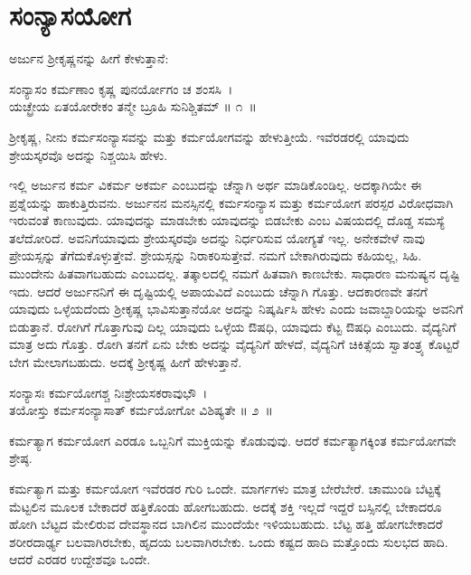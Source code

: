 
\chapter{ಸಂನ್ಯಾಸಯೋಗ}

ಅರ್ಜುನ ಶ‍್ರೀಕೃಷ್ಣನನ್ನು ಹೀಗೆ ಕೇಳುತ್ತಾನೆ:

\begin{shloka}
ಸಂನ್ಯಾಸಂ ಕರ್ಮಣಾಂ ಕೃಷ್ಣ ಪುನರ್ಯೋಗಂ ಚ ಶಂಸಸಿ~।\\ಯಚ್ಛ್ರೇಯ ಏತಯೋರೇಕಂ ತನ್ಮೇ ಬ್ರೂಹಿ ಸುನಿಶ್ಚಿತಮ್ \hfill॥ ೧~॥
\end{shloka}

\begin{artha}
ಶ‍್ರೀಕೃಷ್ಣ, ನೀನು ಕರ್ಮಸಂನ್ಯಾಸವನ್ನು ಮತ್ತು ಕರ್ಮಯೋಗವನ್ನು ಹೇಳುತ್ತೀಯೆ. ಇವೆರಡರಲ್ಲಿ ಯಾವುದು ಶ್ರೇಯಸ್ಕರವೊ ಅದನ್ನು ನಿಶ್ಚಯಿಸಿ ಹೇಳು.
\end{artha}

ಇಲ್ಲಿ ಅರ್ಜುನ ಕರ್ಮ ವಿಕರ್ಮ ಅಕರ್ಮ ಎಂಬುದನ್ನು ಚೆನ್ನಾಗಿ ಅರ್ಥ ಮಾಡಿಕೊಂಡಿಲ್ಲ. ಅದಕ್ಕಾಗಿಯೇ ಈ ಪ್ರಶ್ನೆಯನ್ನು ಹಾಕುತ್ತಿರುವನು. ಅರ್ಜುನನ ಮನಸ್ಸಿನಲ್ಲಿ ಕರ್ಮಸಂನ್ಯಾಸ ಮತ್ತು ಕರ್ಮಯೋಗ ಪರಸ್ಪರ ವಿರೋಧವಾಗಿ ಇರುವಂತೆ ಕಾಣುವುದು. ಯಾವುದನ್ನು ಮಾಡಬೇಕು ಯಾವುದನ್ನು ಬಿಡಬೇಕು ಎಂಬ ವಿಷಯದಲ್ಲಿ ದೊಡ್ಡ ಸಮಸ್ಯೆ ತಲೆದೋರಿದೆ. ಅವನಿಗೆ\break ಯಾವುದು ಶ್ರೇಯಸ್ಕರವೊ ಅದನ್ನು ನಿರ್ಧರಿಸುವ ಯೋಗ್ಯತೆ ಇಲ್ಲ. ಅನೇಕವೇಳೆ ನಾವು ಪ್ರೇಯಸ್ಸನ್ನು ತೆಗೆದುಕೊಳ್ಳುತ್ತೇವೆ. ಶ್ರೇಯಸ್ಸನ್ನು ನಿರಾಕರಿಸುತ್ತೇವೆ. ನಮಗೆ ಬೇಕಾಗಿರುವುದು ಕಹಿಯಲ್ಲ, ಸಿಹಿ. ಮುಂದೇನು ಹಿತವಾಗಬಹುದು ಎಂಬುದಲ್ಲ. ತತ್ಕಾಲದಲ್ಲಿ ನಮಗೆ ಹಿತವಾಗಿ ಕಾಣಬೇಕು. ಸಾಧಾರಣ ಮನುಷ್ಯನ ದೃಷ್ಟಿ ಇದು. ಆದರೆ ಅರ್ಜುನನಿಗೆ ಈ ದೃಷ್ಟಿಯಲ್ಲಿ ಅಪಾಯವಿದೆ ಎಂಬುದು ಚೆನ್ನಾಗಿ ಗೊತ್ತು. ಆದಕಾರಣವೇ ತನಗೆ ಯಾವುದು ಒಳ್ಳೆಯದೆಂದು ಶ‍್ರೀಕೃಷ್ಣ ಭಾವಿಸುತ್ತಾನೆಯೋ ಅದನ್ನು ನಿಷ್ಕರ್ಷಿಸಿ ಹೇಳು ಎಂದು ಜವಾಬ್ದಾರಿಯನ್ನು ಅವನಿಗೆ ಬಿಡುತ್ತಾನೆ. ರೋಗಿಗೆ ಗೊತ್ತಾಗುವು ದಿಲ್ಲ ಯಾವುದು ಒಳ್ಳೆಯ ಔಷಧಿ, ಯಾವುದು ಕೆಟ್ಟ ಔಷಧಿ ಎಂಬುದು. ವೈದ್ಯನಿಗೆ ಮಾತ್ರ ಅದು ಗೊತ್ತು. ರೋಗಿ ತನಗೆ ಏನು ಬೇಕು ಅದನ್ನು ವೈದ್ಯನಿಗೆ ಹೇಳದೆ, ವೈದ್ಯನಿಗೆ ಚಿಕಿತ್ಸೆಯ ಸ್ವಾತಂತ್ರ್ಯ ಕೊಟ್ಟರೆ ಬೇಗ ಮೇಲಾಗಬಹುದು. ಅದಕ್ಕೆ ಶ‍್ರೀಕೃಷ್ಣ ಹೀಗೆ ಹೇಳುತ್ತಾನೆ.

\begin{shloka}
ಸಂನ್ಯಾಸಃ ಕರ್ಮಯೋಗಶ್ಚ ನಿಃಶ್ರೇಯಸಕರಾವುಭೌ~।\\ತಯೋಸ್ತು ಕರ್ಮಸಂನ್ಯಾಸಾತ್ ಕರ್ಮಯೋಗೋ ವಿಶಿಷ್ಯತೇ \hfill॥ ೨~॥
\end{shloka}

\begin{artha}
ಕರ್ಮತ್ಯಾಗ ಕರ್ಮಯೋಗ ಎರಡೂ ಒಬ್ಬನಿಗೆ ಮುಕ್ತಿಯನ್ನು ಕೊಡುವುವು. ಆದರೆ ಕರ್ಮತ್ಯಾಗ\-ಕ್ಕಿಂತ ಕರ್ಮಯೋಗವೇ ಶ್ರೇಷ್ಠ.
\end{artha}

ಕರ್ಮತ್ಯಾಗ ಮತ್ತು ಕರ್ಮಯೋಗ ಇವೆರಡರ ಗುರಿ ಒಂದೇ. ಮಾರ್ಗಗಳು ಮಾತ್ರ ಬೇರೆಬೇರೆ. ಚಾಮುಂಡಿ ಬೆಟ್ಟಕ್ಕೆ ಮೆಟ್ಟಲಿನ ಮೂಲಕ ಬೇಕಾದರೆ ಹತ್ತಿಕೊಂಡು ಹೋಗಬಹುದು. ಅದಕ್ಕೆ ಶಕ್ತಿ ಇಲ್ಲದೆ ಇದ್ದರೆ ಬಸ್ಸಿನಲ್ಲಿ ಬೇಕಾದರೂ ಹೋಗಿ ಬೆಟ್ಟದ ಮೇಲಿರುವ ದೇವಸ್ಥಾನದ ಬಾಗಿಲಿನ ಮುಂದೆಯೇ ಇಳಿಯಬಹುದು. ಬೆಟ್ಟ ಹತ್ತಿ ಹೋಗಬೇಕಾದರೆ ಶರೀರದಾರ್ಢ್ಯ ಬಲವಾಗಿರಬೇಕು, ಹೃದಯ ಬಲವಾಗಿರಬೇಕು. ಒಂದು ಕಷ್ಟದ ಹಾದಿ ಮತ್ತೊಂದು ಸುಲಭದ ಹಾದಿ. ಆದರೆ ಎರಡರ ಉದ್ದೇಶವೂ ಒಂದೇ.

